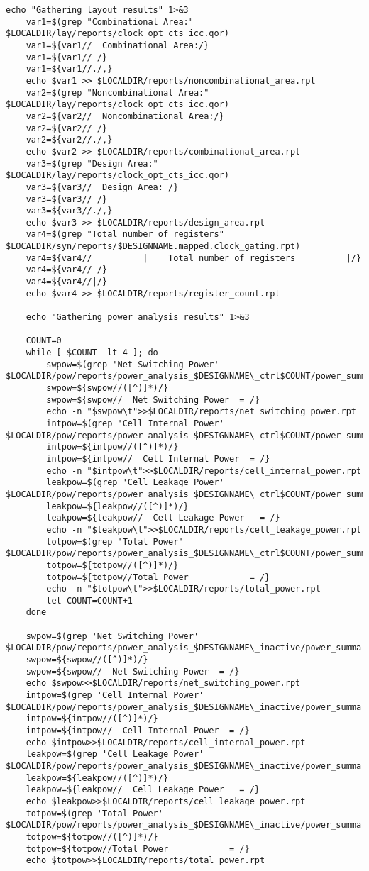 \begin{lstlisting}[caption={HLS Script source code},label=lst:hlsscriptsourcecode]
	echo "Gathering layout results" 1>&3
	var1=$(grep "Combinational Area:" $LOCALDIR/lay/reports/clock_opt_cts_icc.qor)
	var1=${var1//  Combinational Area:/}
	var1=${var1// /}
	var1=${var1//./,}
	echo $var1 >> $LOCALDIR/reports/noncombinational_area.rpt
	var2=$(grep "Noncombinational Area:" $LOCALDIR/lay/reports/clock_opt_cts_icc.qor)
	var2=${var2//  Noncombinational Area:/}
	var2=${var2// /}
	var2=${var2//./,}
	echo $var2 >> $LOCALDIR/reports/combinational_area.rpt
	var3=$(grep "Design Area:" $LOCALDIR/lay/reports/clock_opt_cts_icc.qor)
	var3=${var3//  Design Area: /}
	var3=${var3// /}
	var3=${var3//./,}
	echo $var3 >> $LOCALDIR/reports/design_area.rpt
	var4=$(grep "Total number of registers" $LOCALDIR/syn/reports/$DESIGNNAME.mapped.clock_gating.rpt)
	var4=${var4//          |    Total number of registers          |/}
	var4=${var4// /}
	var4=${var4//|/}
	echo $var4 >> $LOCALDIR/reports/register_count.rpt
	
	echo "Gathering power analysis results" 1>&3
	
	COUNT=0
	while [ $COUNT -lt 4 ]; do
		swpow=$(grep 'Net Switching Power' $LOCALDIR/pow/reports/power_analysis_$DESIGNNAME\_ctrl$COUNT/power_summary.rpt)
		swpow=${swpow//([^)]*)/}
		swpow=${swpow//  Net Switching Power  = /}
		echo -n "$swpow\t">>$LOCALDIR/reports/net_switching_power.rpt
		intpow=$(grep 'Cell Internal Power' $LOCALDIR/pow/reports/power_analysis_$DESIGNNAME\_ctrl$COUNT/power_summary.rpt)
		intpow=${intpow//([^)]*)/}
		intpow=${intpow//  Cell Internal Power  = /}
		echo -n "$intpow\t">>$LOCALDIR/reports/cell_internal_power.rpt
		leakpow=$(grep 'Cell Leakage Power' $LOCALDIR/pow/reports/power_analysis_$DESIGNNAME\_ctrl$COUNT/power_summary.rpt)
		leakpow=${leakpow//([^)]*)/}
		leakpow=${leakpow//  Cell Leakage Power   = /}
		echo -n "$leakpow\t">>$LOCALDIR/reports/cell_leakage_power.rpt
		totpow=$(grep 'Total Power' $LOCALDIR/pow/reports/power_analysis_$DESIGNNAME\_ctrl$COUNT/power_summary.rpt)
		totpow=${totpow//([^)]*)/}
		totpow=${totpow//Total Power            = /}
		echo -n "$totpow\t">>$LOCALDIR/reports/total_power.rpt
		let COUNT=COUNT+1 
	done
	
	swpow=$(grep 'Net Switching Power' $LOCALDIR/pow/reports/power_analysis_$DESIGNNAME\_inactive/power_summary.rpt)
	swpow=${swpow//([^)]*)/}
	swpow=${swpow//  Net Switching Power  = /}
	echo $swpow>>$LOCALDIR/reports/net_switching_power.rpt
	intpow=$(grep 'Cell Internal Power' $LOCALDIR/pow/reports/power_analysis_$DESIGNNAME\_inactive/power_summary.rpt)
	intpow=${intpow//([^)]*)/}
	intpow=${intpow//  Cell Internal Power  = /}
	echo $intpow>>$LOCALDIR/reports/cell_internal_power.rpt
	leakpow=$(grep 'Cell Leakage Power' $LOCALDIR/pow/reports/power_analysis_$DESIGNNAME\_inactive/power_summary.rpt)
	leakpow=${leakpow//([^)]*)/}
	leakpow=${leakpow//  Cell Leakage Power   = /}
	echo $leakpow>>$LOCALDIR/reports/cell_leakage_power.rpt
	totpow=$(grep 'Total Power' $LOCALDIR/pow/reports/power_analysis_$DESIGNNAME\_inactive/power_summary.rpt)
	totpow=${totpow//([^)]*)/}
	totpow=${totpow//Total Power            = /}
	echo $totpow>>$LOCALDIR/reports/total_power.rpt
		

\end{lstlisting}
